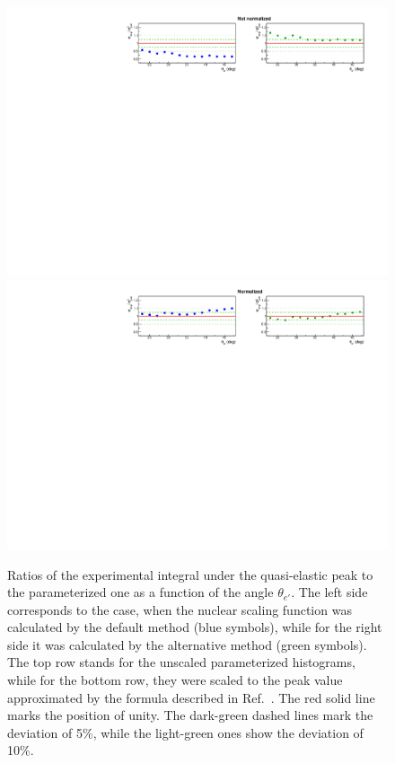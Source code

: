 \begin{figure}[htp]
\begin{center}
\begin{framed}
\includegraphics[width=\textwidth]{pictures/normalization/my_ratio_not_norm.pdf}
\includegraphics[width=\textwidth]{pictures/normalization/my_ratio_norm.pdf}
\end{framed}
\caption{\small Ratios of the experimental integral under the quasi-elastic peak to the parameterized one as a function of the angle $\theta_{e'}$. The left side corresponds to the case, when the nuclear scaling function was calculated by the default method (blue symbols), while for the right side it was calculated by the alternative method (green symbols). The top row stands for the unscaled parameterized histograms, while for the bottom row, they were scaled to the peak value approximated by the formula described in Ref.~\cite{note_QE_peak}. The red solid line marks the position of unity. The dark-green dashed lines mark the deviation of 5\%, while the light-green ones show the deviation of 10\%.} \label{fig:my_ratio}
\end{center}
\end{figure}


